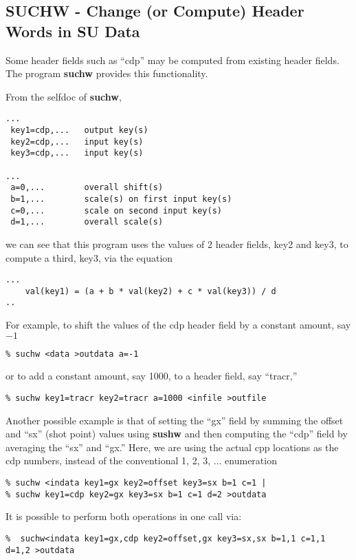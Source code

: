 {{{\subsection{SUCHW - Change (or Compute) Header Words in SU Data}

Some header fields such as ``cdp'' may be computed from existing
header fields. The program {\bf suchw\/} provides this functionality.

From the selfdoc of {\bf suchw},
{\small \begin{verbatim}
...
 key1=cdp,...	output key(s) 						
 key2=cdp,...	input key(s) 						
 key3=cdp,...	input key(s)  						

...
 a=0,...		overall shift(s)				
 b=1,...		scale(s) on first input key(s) 			
 c=0,...		scale on second input key(s) 			
 d=1,...		overall scale(s)				
\end{verbatim}}\noindent
we can see that this program uses the values of 2 header fields,
key2 and key3, to compute a third, key3, via the equation 
{\small \begin{verbatim}
...
	val(key1) = (a + b * val(key2) + c * val(key3)) / d		
..
\end{verbatim}}\noindent

For example, to shift the values of the  cdp header field by a constant
amount, say $-1$
{\small \begin{verbatim}
% suchw <data >outdata a=-1					
\end{verbatim}}\noindent
or to add a constant amount, say 1000, to a header field, say ``tracr,''
{\small \begin{verbatim}
% suchw key1=tracr key2=tracr a=1000 <infile >outfile		
\end{verbatim}}\noindent

Another possible example is that of setting the ``gx'' 
field by summing the offset and ``sx'' (shot point) values
using {\bf sushw\/} and then computing the  ``cdp'' field
by averaging the ``sx'' and ``gx.''
Here, we are using the
actual cpp locations as the cdp numbers, instead of
the conventional 1, 2, 3, ... enumeration
{\small \begin{verbatim}
% suchw <indata key1=gx key2=offset key3=sx b=1 c=1 |			
% suchw key1=cdp key2=gx key3=sx b=1 c=1 d=2 >outdata			
\end{verbatim}}\noindent

It is possible to perform both operations in one call via:
{\small \begin{verbatim}
%  suchw<indata key1=gx,cdp key2=offset,gx key3=sx,sx b=1,1 c=1,1 d=1,2 >outdata
\end{verbatim}}\noindent

}}}
